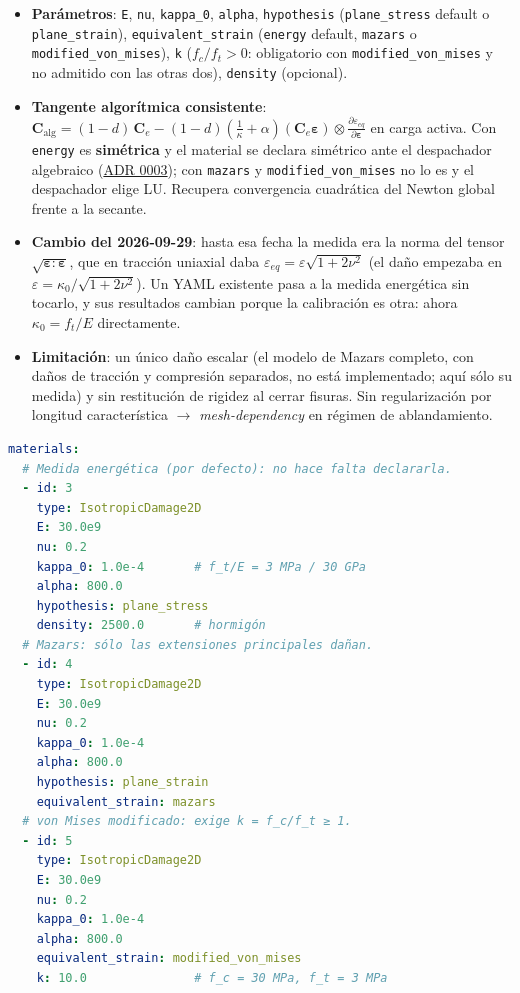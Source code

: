 \documentclass[11pt,oneside]{report}
\begin{document}
\begin{itemize}
  \item \textbf{Parámetros}: \texttt{E}, \texttt{nu}, \texttt{kappa\_0}, \texttt{alpha}, \texttt{hypothesis} (\texttt{plane\_stress} default o \texttt{plane\_strain}), \texttt{equivalent\_\allowbreak{}strain} (\texttt{energy} default, \texttt{mazars} o \texttt{modified\_\allowbreak{}von\_\allowbreak{}mises}), \texttt{k} ($f_c/f_t > 0$: obligatorio con \texttt{modified\_\allowbreak{}von\_\allowbreak{}mises} y no admitido con las otras dos), \texttt{density} (opcional).
  \item \textbf{Tangente algorítmica consistente}: $\mathbf C_{\text{alg}} = (1-d)\,\mathbf C_e - (1-d)\left(\frac1\kappa + \alpha\right)(\mathbf C_e\boldsymbol\varepsilon) \otimes \frac{\partial\varepsilon_{eq}}{\partial\boldsymbol\varepsilon}$ en carga activa. Con \texttt{energy} es \textbf{simétrica} y el material se declara simétrico ante el despachador algebraico (\href{https://github.com/jretamav/solidum-fem/blob/main/docs/adr/0003-despachador-de-solver-algebraico.md}{ADR 0003}); con \texttt{mazars} y \texttt{modified\_\allowbreak{}von\_\allowbreak{}mises} no lo es y el despachador elige LU. Recupera convergencia cuadrática del Newton global frente a la secante.
  \item \textbf{Cambio del 2026-09-29}: hasta esa fecha la medida era la norma del tensor $\sqrt{\boldsymbol\varepsilon:\boldsymbol\varepsilon}$, que en tracción uniaxial daba $\varepsilon_{eq} = \varepsilon\sqrt{1+2\nu^2}$ (el daño empezaba en $\varepsilon = \kappa_0/\sqrt{1+2\nu^2}$). Un YAML existente pasa a la medida energética sin tocarlo, y sus resultados cambian porque la calibración es otra: ahora $\kappa_0 = f_t/E$ directamente.
  \item \textbf{Limitación}: un único daño escalar (el modelo de Mazars completo, con daños de tracción y compresión separados, no está implementado; aquí sólo su medida) y sin restitución de rigidez al cerrar fisuras. Sin regularización por longitud característica $\to$ \textit{mesh-dependency} en régimen de ablandamiento.
\end{itemize}

\begin{lstlisting}[language=yaml]
materials:
  # Medida energética (por defecto): no hace falta declararla.
  - id: 3
    type: IsotropicDamage2D
    E: 30.0e9
    nu: 0.2
    kappa_0: 1.0e-4       # f_t/E = 3 MPa / 30 GPa
    alpha: 800.0
    hypothesis: plane_stress
    density: 2500.0       # hormigón
  # Mazars: sólo las extensiones principales dañan.
  - id: 4
    type: IsotropicDamage2D
    E: 30.0e9
    nu: 0.2
    kappa_0: 1.0e-4
    alpha: 800.0
    hypothesis: plane_strain
    equivalent_strain: mazars
  # von Mises modificado: exige k = f_c/f_t ≥ 1.
  - id: 5
    type: IsotropicDamage2D
    E: 30.0e9
    nu: 0.2
    kappa_0: 1.0e-4
    alpha: 800.0
    equivalent_strain: modified_von_mises
    k: 10.0               # f_c = 30 MPa, f_t = 3 MPa

\end{lstlisting}
\end{document}
